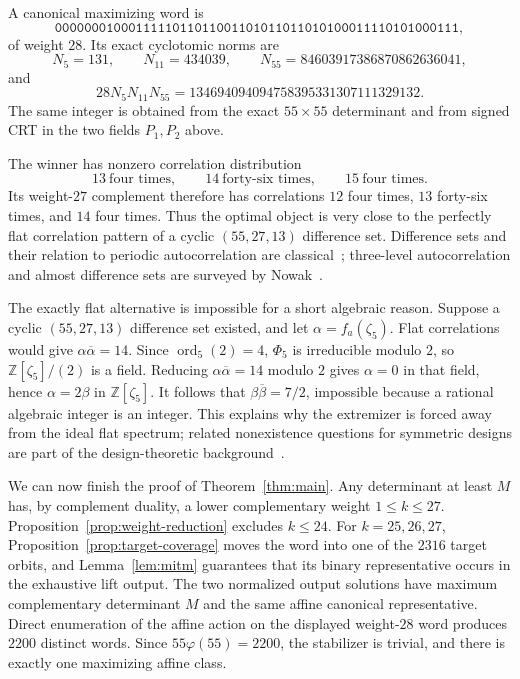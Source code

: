 \documentclass[11pt,a4paper]{article}
\theoremstyle{definition}
\theoremstyle{remark}
\newcommand{\Z}{\mathbb Z}
\newcommand{\M}{134694094094758395331307111329132}
\begin{document}
A canonical maximizing word is
\[
\boxed{\texttt{0000000100011111011011001101011011010100011110101000111}},
\]
of weight $28$.  Its exact cyclotomic norms are
\[
  N_5=131,\qquad
  N_{11}=434039,\qquad
  N_{55}=84603917386870862636041,
\]
and
\[
  28N_5N_{11}N_{55}=\M.
\]
The same integer is obtained from the exact $55\times55$ determinant and from
signed CRT in the two fields $P_1,P_2$ above.

The winner has nonzero correlation distribution
\[
  13\ \text{four times},\qquad
  14\ \text{forty-six times},\qquad
  15\ \text{four times}.
\]
Its weight-$27$ complement therefore has correlations $12$ four times,
$13$ forty-six times, and $14$ four times.  Thus the optimal object is very
close to the perfectly flat correlation pattern of a cyclic
$(55,27,13)$ difference set.  Difference sets and their relation to periodic
autocorrelation are classical~\cite{baumert}; three-level autocorrelation and
almost difference sets are surveyed by Nowak~\cite{nowak}.

The exactly flat alternative is impossible for a short algebraic reason.
Suppose a cyclic $(55,27,13)$ difference set existed, and let
$\alpha=f_a(\zeta_5)$.  Flat correlations would give
$\alpha\overline\alpha=14$.  Since $\operatorname{ord}_5(2)=4$,
$\Phi_5$ is irreducible modulo $2$, so
$\Z[\zeta_5]/(2)$ is a field.  Reducing
$\alpha\overline\alpha=14$ modulo $2$ gives $\alpha=0$ in that field, hence
$\alpha=2\beta$ in $\Z[\zeta_5]$.  It follows that
$\beta\overline\beta=7/2$, impossible because a rational algebraic integer is
an integer.  This explains why the extremizer is forced away from the ideal
flat spectrum; related nonexistence questions for symmetric designs are part
of the design-theoretic background~\cite{braic}.

We can now finish the proof of Theorem~\ref{thm:main}.  Any determinant at
least $M$ has, by complement duality, a lower complementary weight
$1\le k\le27$.  Proposition~\ref{prop:weight-reduction} excludes $k\le24$.
For $k=25,26,27$, Proposition~\ref{prop:target-coverage} moves the word into
one of the $2316$ target orbits, and Lemma~\ref{lem:mitm} guarantees that its
binary representative occurs in the exhaustive lift output.  The two
normalized output solutions have maximum complementary determinant $M$ and
the same affine canonical representative.  Direct enumeration of the affine
action on the displayed weight-$28$ word produces $2200$ distinct words.
Since $55\varphi(55)=2200$, the stabilizer is trivial, and there is exactly one
maximizing affine class.
\end{document}
